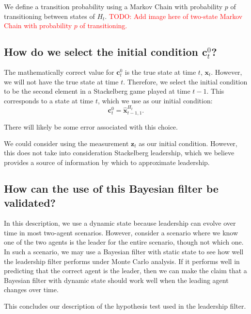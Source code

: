 \documentclass[11pt]{article}
\newcommand\truestate[1]{\bm{x}_{#1}}
\newcommand\obs[1]{\bm{z}_{#1}}
\newcommand\stackmeas[2]{\bm{\hat{x}}^{#1}_{#2}}
\newcommand\initcond[1]{\bm{c}^{0}_{#1}}
\newcommand\todo[1]{\textcolor{red}{TODO: #1}}
\begin{document}
We define a transition probability using a Markov Chain with probability $p$ of transitioning between states of $H_t$.
\todo{Add image here of two-state Markov Chain with probability $p$ of transitioning.}


\subsection{How do we select the initial condition $\initcond{t}$?}
The mathematically correct value for $\initcond{t}$ is the true state at time $t$, $\truestate{t}$. However, we will not have the true state at time $t$. Therefore, we select the initial condition to be the second element in a Stackelberg game played at time $t-1$. This corresponds to a state at time $t$, which we use as our initial condition:
\begin{equation}
\initcond{t} = \stackmeas{H_t}{t-1, 1}.
\end{equation}

There will likely be some error associated with this choice.

We could consider using the measurement $\obs{t}$ as our initial condition. However, this does not take into consideration Stackelberg leadership, which we believe provides a source of information by which to approximate leadership.

\subsection{How can the use of this Bayesian filter be validated?}
In this description, we use a dynamic state because leadership can evolve over time in most two-agent scenarios. However, consider a scenario where we know one of the two agents is the leader for the entire scenario, though not which one. In such a scenario, we may use a Bayesian filter with static state to see how well the leadership filter performs under Monte Carlo analysis. If it performs well in predicting that the correct agent is the leader, then we can make the claim that a Bayesian filter with dynamic state should work well when the leading agent changes over time.

This concludes our description of the hypothesis test used in the leadership filter.
\end{document}
